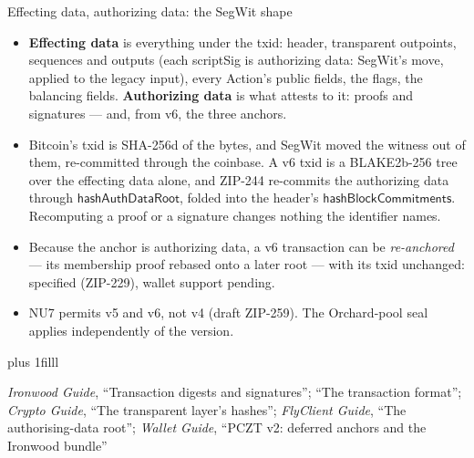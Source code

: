 \documentclass[aspectratio=169,11pt]{beamer}
\newcommand{\src}[1]{\par\vskip0pt plus 1filll
  {\fontsize{6}{7.2}\selectfont\color{arbdim}\raggedright #1\par}}
\begin{document}
\begin{frame}{Effecting data, authorizing data: the SegWit shape}
\small
\begin{itemize}
  \item \textbf{Effecting data} is everything under the txid: header,
    transparent outpoints, sequences and outputs (each scriptSig is
    authorizing data: SegWit's move, applied to the legacy input), every
    Action's public fields, the flags, the balancing fields.
    \textbf{Authorizing data} is what attests to it: proofs and
    signatures --- and, from v6, the three anchors.
  \item Bitcoin's txid is SHA-256d of the bytes, and SegWit moved the
    witness out of them, re-committed through the coinbase. A v6 txid is
    a BLAKE2b-256 tree over the effecting data alone, and ZIP-244
    re-commits the authorizing data through $\mathsf{hashAuthDataRoot}$,
    folded into the header's $\mathsf{hashBlockCommitments}$. Recomputing
    a proof or a signature changes nothing the identifier names.
  \item Because the anchor is authorizing data, a v6 transaction can be
    \emph{re-anchored} --- its membership proof rebased onto a later
    root --- with its txid unchanged: specified (ZIP-229), wallet
    support pending.
  \item NU7 permits v5 and v6, not v4 (draft ZIP-259).
    The Orchard-pool seal applies independently of the version.
\end{itemize}
\src{\emph{Ironwood Guide}, ``Transaction digests and signatures''; ``The
  transaction format''; \emph{Crypto Guide}, ``The transparent layer's hashes'';
  \emph{FlyClient Guide}, ``The authorising-data root''; \emph{Wallet Guide},
  ``PCZT v2: deferred anchors and the Ironwood bundle''}
\end{frame}
\end{document}
